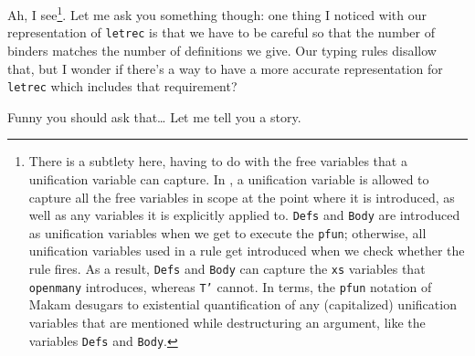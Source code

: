 \heroSTUDENT{} Ah, I
see\footnote{There is a subtlety here, having to do with the free variables that a unification variable
can capture. In \lamprolog, a unification variable is allowed to capture all the free variables in scope at the
point where it is introduced, as well as any variables it is explicitly applied to. \texttt{Defs} and \texttt{Body} are introduced as unification variables when we get to execute the \texttt{pfun}; otherwise, all unification variables used in a rule get introduced when we check whether the rule fires. As a result, \texttt{Defs} and \texttt{Body} can capture the \texttt{xs} variables that \texttt{openmany} introduces, whereas \texttt{T'} cannot. In \lamprolog terms, the \texttt{pfun} notation of Makam desugars to existential quantification of any (capitalized) unification variables that are mentioned while destructuring an argument, like the variables \texttt{Defs} and \texttt{Body}.}.
Let me ask you something though: one thing I noticed with our
representation of \texttt{letrec} is that we have to be careful so that
the number of binders matches the number of definitions we give. Our
typing rules disallow that, but I wonder if there's a way to have a more
accurate representation for \texttt{letrec} which includes that
requirement?

\heroADVISOR{} Funny you should ask that\ldots{} Let me tell you a story.
